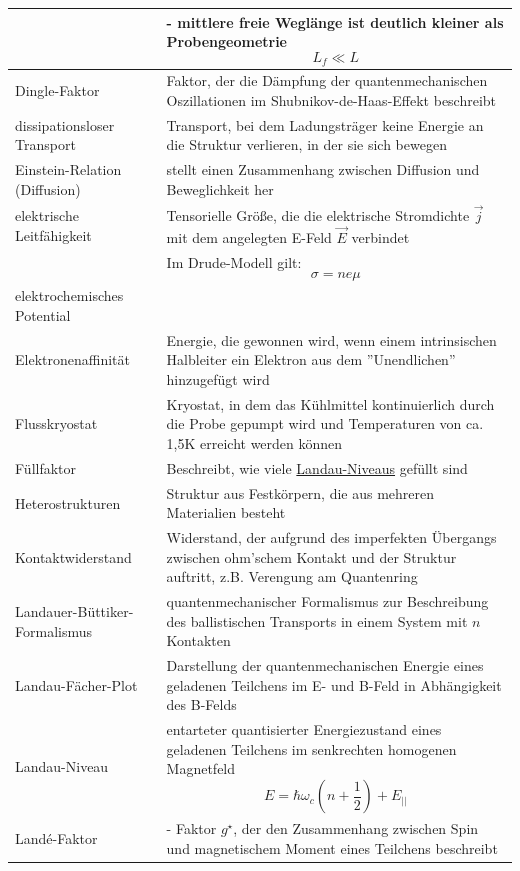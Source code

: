 \documentclass{article}
\newcommand{\lr}[1]{\left(#1\right)}
\begin{document}
\begin{xltabular}{\linewidth}{p{6cm}|X}
		& - mittlere freie Weglänge ist deutlich kleiner als Probengeometrie
			$$L_f \ll L$$ \\
	\hline
		Dingle-Faktor & Faktor, der die Dämpfung der quantenmechanischen Oszillationen im Shubnikov-de-Haas-Effekt beschreibt \\
	\hline
		dissipationsloser Transport & Transport, bei dem Ladungsträger keine Energie an die Struktur verlieren, in der sie sich bewegen \\
	\hline
		Einstein-Relation (Diffusion) & stellt einen Zusammenhang zwischen Diffusion und Beweglichkeit her \\
	\hline
		elektrische Leitfähigkeit & Tensorielle Größe, die die elektrische Stromdichte $\vec{j}$ mit dem angelegten E-Feld $\vec{E}$ verbindet \\
		& Im Drude-Modell gilt:
			$$\sigma = n e \mu$$ \\
	\hline
		elektrochemisches Potential &  \\
	\hline
		Elektronenaffinität & Energie, die gewonnen wird, wenn einem intrinsischen Halbleiter ein Elektron aus dem ''Unendlichen'' hinzugefügt wird \\
	\hline
		Flusskryostat & Kryostat, in dem das Kühlmittel kontinuierlich durch die Probe gepumpt wird und Temperaturen von ca. 1,5K erreicht werden können \\
	\hline
		Füllfaktor & Beschreibt, wie viele \underline{Landau-Niveaus} gefüllt sind \\
	\hline
		Heterostrukturen & Struktur aus Festkörpern, die aus mehreren Materialien besteht \\
	\hline
		Kontaktwiderstand & Widerstand, der aufgrund des imperfekten Übergangs zwischen ohm'schem Kontakt und der Struktur auftritt, z.B. Verengung am Quantenring \\
	\hline
		Landauer-Büttiker-Formalismus & quantenmechanischer Formalismus zur Beschreibung des ballistischen Transports in einem System mit $n$ Kontakten \\
	\hline
		Landau-Fächer-Plot & Darstellung der quantenmechanischen Energie eines geladenen Teilchens im E- und B-Feld in Abhängigkeit des B-Felds \\
	\hline
		Landau-Niveau & entarteter quantisierter Energiezustand eines geladenen Teilchens im senkrechten homogenen Magnetfeld 
			$$E = \hbar\omega_c \lr{ n + \frac{1}{2} } + E_{||}$$\\
	\hline
		Landé-Faktor & - Faktor $g^\star$, der den Zusammenhang zwischen Spin und magnetischem Moment eines Teilchens beschreibt \\

\end{xltabular}
\end{document}
